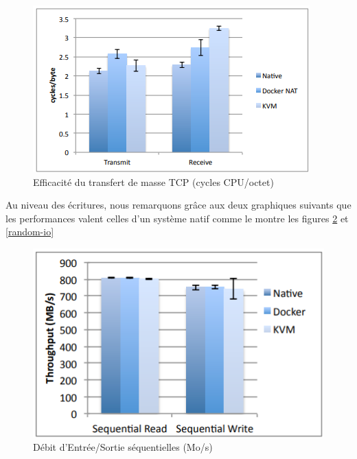\documentclass[
    iai, %
    il, %
]{heig-tb}
\begin{document}
\begin{center}
    \begin{figure}
        \includegraphics[width=\textwidth]{./assets/figures/docker-perf-transfer-efficiancy.png}
        \caption[Docker efficacité du transfert de masse]{Efficacité du transfert de masse TCP (cycles CPU/octet) \cite{rad2017introduction} \label{tcp-transfer-latency}}
    \end{figure}
\end{center}

Au niveau des écritures, nous remarquons grâce aux deux graphiques suivants que les performances valent
celles d'un système natif comme le montre les figures \ref{sequential-io} et \ref{random-io}

\begin{center}
    \begin{figure}
        \includegraphics[width=\textwidth]{./assets/figures/docker-perf-sequential-io.png}
        \caption[Docker débit d'I/O séquentielles]{Débit d'Entrée/Sortie séquentielles (Mo/s) \cite{rad2017introduction} \label{sequential-io}}
    \end{figure}
\end{center}
\end{document}
